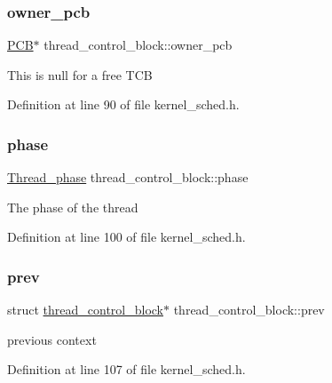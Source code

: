 \subsubsection{\texorpdfstring{owner\+\_\+pcb}{owner\_pcb}}
{\footnotesize\ttfamily \hyperlink{group__proc_gadf327f09ee935cf1734c14e8849f0421}{P\+CB}$\ast$ thread\+\_\+control\+\_\+block\+::owner\+\_\+pcb}

This is null for a free T\+CB 

Definition at line 90 of file kernel\+\_\+sched.\+h.

\mbox{\label{structthread__control__block_aa7e8e6a00c5f9f25210a49589ad818f8}} 
\subsubsection{\texorpdfstring{phase}{phase}}
{\footnotesize\ttfamily \hyperlink{group__scheduler_gab180b4aa356776bddcd724cef4f5deae}{Thread\+\_\+phase} thread\+\_\+control\+\_\+block\+::phase}

The phase of the thread 

Definition at line 100 of file kernel\+\_\+sched.\+h.

\mbox{\label{structthread__control__block_a605a6e9bb8154b658ee72e193599d180}} 
\subsubsection{\texorpdfstring{prev}{prev}}
{\footnotesize\ttfamily struct \hyperlink{structthread__control__block}{thread\+\_\+control\+\_\+block}$\ast$ thread\+\_\+control\+\_\+block\+::prev}

previous context 

Definition at line 107 of file kernel\+\_\+sched.\+h.

\mbox{\label{structthread__control__block_add433b079e04053fe70fdd2b92e1d6ad}} 
